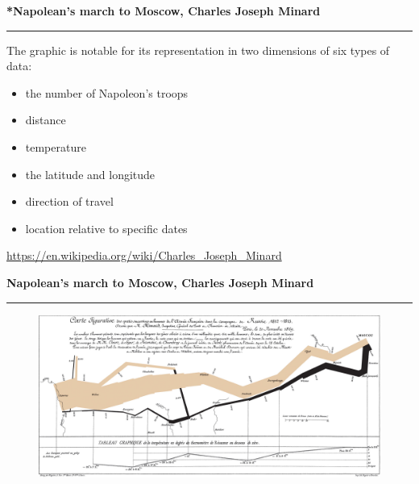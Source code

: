 \documentclass[pdf]{beamer}
\begin{document}
\begin{frame}
	{{\textbf{*Napolean's march to Moscow, Charles Joseph Minard}}}{\textcolor{red}{\rule{12cm}{1.2pt}}}

The graphic is notable for its representation in two dimensions of six types of data:

\begin{itemize}
\item the number of Napoleon's troops

\item distance

\item temperature

\item the latitude and longitude

\item direction of travel

\item location relative to specific dates
\newline
\end{itemize}

\url{https://en.wikipedia.org/wiki/Charles_Joseph_Minard}

\end{frame}



\begin{frame}
	{{\textbf{Napolean's march to Moscow, Charles Joseph Minard}}}{\textcolor{red}{\rule{12cm}{1.2pt}}}

\begin{figure}
\includegraphics[scale=0.23]{19_Minard.png}
\end{figure}

\end{frame}



\end{document}

